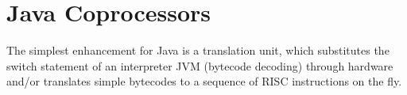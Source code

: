 %
%




\section{Java Coprocessors}

The simplest enhancement for Java is a translation unit, which
substitutes the switch statement of an interpreter JVM (bytecode
decoding) through hardware and/or translates simple bytecodes
to a sequence of RISC instructions on the fly.

